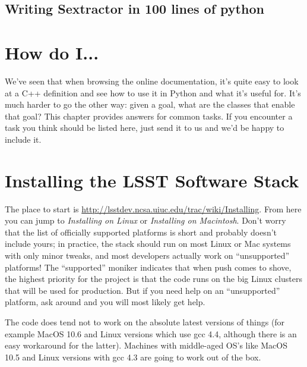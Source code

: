 \documentclass{book}
\begin{document}
\section{Writing Sextractor in 100 lines of python}
 
\chapter{How do I...}

We've seen that when browsing the online documentation, it's quite
easy to look at a C++ definition and see how to use it in Python and
what it's useful for.  It's much harder to go the other way: given a
goal, what are the classes that enable that goal?  This chapter
provides answers for common tasks. If you encounter a task you think
should be listed here, just send it to us and we'd be happy to include
it.

%
% 
%

\appendix

\chapter{Installing the LSST Software
  Stack\label{appendix-stackinstall}}


The place to start is
\url{http://lsstdev.ncsa.uiuc.edu/trac/wiki/Installing}.  From here
you can jump to {\it Installing on Linux} or {\it Installing on
  Macintosh}.  Don't worry that the list of officially supported
platforms is short and probably doesn't include yours; in practice,
the stack should run on most Linux or Mac systems with only minor
tweaks, and most developers actually work on ``unsupported''
platforms!  The ``supported'' moniker indicates that when push comes
to shove, the highest priority for the project is that the code runs
on the big Linux clusters that will be used for production.  But if
you need help on an ``unsupported'' platform, ask around and you will
most likely get help.

The code does tend not to work on the absolute latest versions of
things (for example MacOS 10.6 and Linux versions which use gcc 4.4,
although there is an easy workaround for the latter).  Machines with
middle-aged OS's like MacOS 10.5 and Linux versions with gcc 4.3 are
going to work out of the box.
\end{document}

